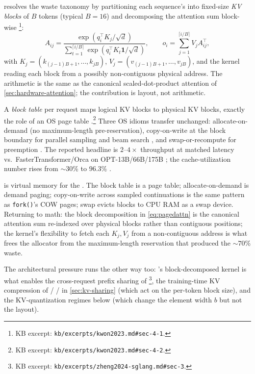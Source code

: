 \citet{kwon2023} resolves the waste taxonomy by partitioning each
sequence's  into fixed-size \emph{KV blocks} of $B$ tokens
(typical $B = 16$) and decomposing the attention sum block-wise
\citep[\S 4.1, Eq.~4]{kwon2023}\footnote{KB excerpt:
\nolinkurl{kb/excerpts/kwon2023.md#sec-4-1}.}:
\begin{equation}
A_{ij} = \frac{\exp(q_i^\top K_j / \sqrt{d})}{\sum_{t=1}^{\lceil i/B \rceil} \exp(q_i^\top K_t \mathbf{1} / \sqrt{d})}, \qquad
o_i = \sum_{j=1}^{\lceil i/B \rceil} V_j A_{ij}^\top,
\label{eq:pagedattn}
\end{equation}
with $K_j = (k_{(j-1)B+1}, \dots, k_{jB})$, $V_j = (v_{(j-1)B+1}, \dots, v_{jB})$,
and the kernel reading each block from a possibly non-contiguous
physical address. The arithmetic is the same as the canonical
scaled-dot-product attention of \cref{sec:hardware-attention}; the
contribution is layout, not arithmetic.

A \emph{block table} per request maps logical KV blocks to physical KV
blocks, exactly the role of an OS page table
\citep[\S 4.2]{kwon2023}.\footnote{KB excerpt:
\nolinkurl{kb/excerpts/kwon2023.md#sec-4-2}.} Three OS idioms transfer
unchanged: allocate-on-demand (no maximum-length pre-reservation),
copy-on-write at the block boundary for parallel sampling and beam
search \citep[\S 4.4]{kwon2023}, and swap-or-recompute for preemption
\citep[\S 4.5]{kwon2023}. The reported headline is $2$--$4\times$
throughput at matched latency vs.\ FasterTransformer/Orca on
OPT-13B/66B/175B \citep[abstract, \S 6.1]{kwon2023}; the cache-utilization
number rises from $\sim 30$\% to $96.3$\% \citep[\S 3, Fig.~2]{kwon2023}.

\begin{analogy}
 is virtual memory for the . The block table is
a page table; allocate-on-demand is demand paging; copy-on-write across
sampled continuations is the same pattern as \texttt{fork()}'s
COW pages; swap evicts blocks to CPU RAM as a swap device. Returning
to math: the block decomposition in \cref{eq:pagedattn} is the
canonical attention sum re-indexed over physical blocks rather than
contiguous positions; the kernel's flexibility to fetch each $K_j, V_j$
from a non-contiguous address is what frees the allocator from the
maximum-length reservation that produced the $\sim 70$\% waste.
\end{analogy}

The architectural pressure runs the other way too: 's
block-decomposed kernel is what enables the cross-request prefix sharing
of  \citep[\S 3]{zheng2024-sglang}\footnote{KB excerpt:
\nolinkurl{kb/excerpts/zheng2024-sglang.md#sec-3}.}, the
training-time KV compression of  /  /  in
\cref{sec:kv-sharing} (which act on the per-token block size), and the
KV-quantization regimes below (which change the element width $b$ but
not the layout).

